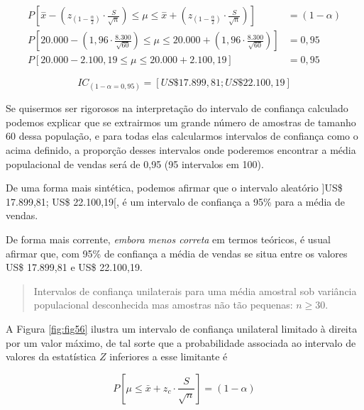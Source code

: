 \documentclass[
]{book}
\begin{document}
\hfill\break

\begin{align*}
P[\stackrel{-}{x}-({z}_{(1-\frac{\alpha }{2})} \cdot \frac{S}{\sqrt{n}}) \le \mu \le \stackrel{-}{x}+({z}_{(1-\frac{\alpha }{2})} \cdot \frac{S}{\sqrt{n}})     ] & = (1-\alpha) \\
P[20.000 - (1,96 \cdot \frac{8.300}{\sqrt{60}}) \le \mu \le 20.000 + (      1,96 \cdot \frac{8.300}{\sqrt{60}})     ] & = 0,95 \\
P[20.000 - 2.100,19  \le \mu \le 20.000 + 2.100,19 ] & = 0,95 
\end{align*}

\hfill\break

\[
IC_{(1-\alpha=0,95)} = [US\$ 17.899,81;US\$ 22.100,19]
\]

\hfill\break

Se quisermos ser rigorosos na interpretação do intervalo de confiança calculado podemos explicar que se extrairmos um grande número de amostras de tamanho 60 dessa população, e para todas elas calcularmos intervalos de confiança como o acima definido, a proporção desses intervalos onde poderemos encontrar a média populacional de vendas será de 0,95 (95 intervalos em 100).

\hfill\break

De uma forma mais sintética, podemos afirmar que o intervalo aleatório {]}US\$ 17.899,81; US\$ 22.100,19{[}, é um intervalo de confiança a 95\% para a média de vendas.

\hfill\break

De forma mais corrente, \emph{embora menos correta} em termos teóricos, é usual afirmar que, com 95\% de confiança a média de vendas se situa entre os valores US\$ 17.899,81 e US\$ 22.100,19.

\hfill\break

\begin{quote}
Intervalos de confiança unilaterais para uma média amostral sob variância populacional desconhecida mas amostras não tão pequenas: \(n \ge 30\).
\end{quote}

\hfill\break

A Figura \ref{fig:fig56} ilustra um intervalo de confiança unilateral limitado à direita por um valor máximo, de tal sorte que a probabilidade associada ao intervalo de valores da estatística \(Z\) inferiores a esse limitante é

\hfill\break

\[
P\left [\mu \le \bar{x} + {z}_{c} \cdot  \frac{S}{\sqrt{n}} \right ] = (1- \alpha)
\]
\end{document}
